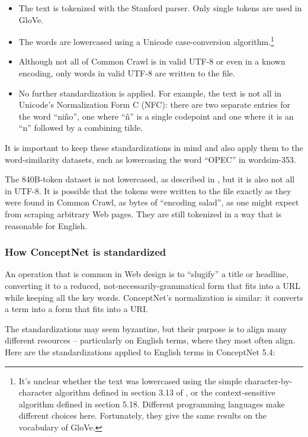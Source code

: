 \documentclass[12pt]{article}
\begin{document}
\begin{itemize}
\item The text is tokenized with the Stanford parser. Only single tokens are
    used in GloVe.
\item The words are lowercased using a Unicode case-conversion
    algorithm.\footnote{
        It's unclear whether the text was lowercased using the simple
        character-by-character algorithm defined in section 3.13 of
        \cite{unicode2014}, or the context-sensitive algorithm defined in section
        5.18. Different programming languages make different choices here.
        Fortunately, they give the same results on the vocabulary of GloVe.
}
\item Although not all of Common Crawl is in valid UTF-8 or even in a known
    encoding, only words in valid UTF-8 are written to the file.
\item No further standardization is applied. For example, the text is not all
    in Unicode's Normalization Form C (NFC): there are two separate entries
    for the word ``ni\~{n}o'', one where ``\~{n}'' is a single codepoint and
    one where it is an ``n'' followed by a combining tilde.
\end{itemize}

It is important to keep these standardizations in mind and also apply them to
the word-similarity datasets, such as lowercasing the word ``OPEC'' in {\sc
wordsim-353}.

The 840B-token dataset is not lowercased, as described in
\cite{pennington2014glove}, but it is also not all in UTF-8. It is possible
that the tokens were written to the file exactly as they were found in
Common Crawl, as bytes of ``encoding salad'', as one might expect from
scraping arbitrary Web pages. They are still tokenized in a way that is
reasonable for English.

\subsubsection{How ConceptNet is standardized}

An operation that is common in Web design is to ``slugify'' a title or
headline, converting it to a reduced, not-necessarily-grammatical form
that fits into a URL while keeping all the key words. ConceptNet's
normalization is similar: it converts a term into a form that fits into
a URI.

The standardizations may seem byzantine, but their purpose is to align many
different resources -- particularly on English terms, where they most often
align. Here are the standardizations applied to English terms in ConceptNet
5.4:
\end{document}
